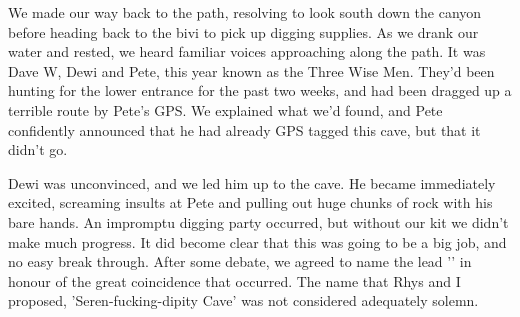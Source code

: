     We made our way back to the path, resolving to look south down the canyon before heading back to the bivi to pick up digging supplies. As we drank our water and rested, we heard familiar voices approaching along the path. It was Dave W, Dewi and Pete, this year known as the Three Wise Men. They'd been hunting for the lower entrance for the past two weeks, and had been dragged up a terrible route by Pete's GPS. We explained what we'd found, and Pete confidently announced that he had already GPS tagged this cave, but that it didn't go.

    Dewi was unconvinced, and we led him up to the cave. He became immediately excited, screaming insults at Pete and pulling out huge chunks of rock with his bare hands. An impromptu digging party occurred, but without our kit we didn't make much progress. It did become clear that this was going to be a big job, and no easy break through. After some debate, we agreed to name the lead '' in honour of the great coincidence that occurred. The name that Rhys and I proposed, 'Seren-fucking-dipity Cave' was not considered adequately solemn.


